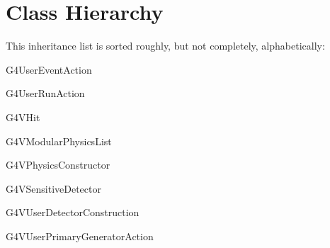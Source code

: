 \section{Class Hierarchy}
This inheritance list is sorted roughly, but not completely, alphabetically\+:\begin{DoxyCompactList}
\item G4\+User\+Event\+Action\begin{DoxyCompactList}
\item {}
\end{DoxyCompactList}
\item G4\+User\+Run\+Action\begin{DoxyCompactList}
\item {}
\end{DoxyCompactList}
\item G4\+V\+Hit\begin{DoxyCompactList}
\item {}
\end{DoxyCompactList}
\item G4\+V\+Modular\+Physics\+List\begin{DoxyCompactList}
\item {}
\end{DoxyCompactList}
\item G4\+V\+Physics\+Constructor\begin{DoxyCompactList}
\item {}
\end{DoxyCompactList}
\item G4\+V\+Sensitive\+Detector\begin{DoxyCompactList}
\item {}
\end{DoxyCompactList}
\item G4\+V\+User\+Detector\+Construction\begin{DoxyCompactList}
\item {}
\end{DoxyCompactList}
\item G4\+V\+User\+Primary\+Generator\+Action\begin{DoxyCompactList}
\item {}
\end{DoxyCompactList}
\item {}
\item {}
\end{DoxyCompactList}
